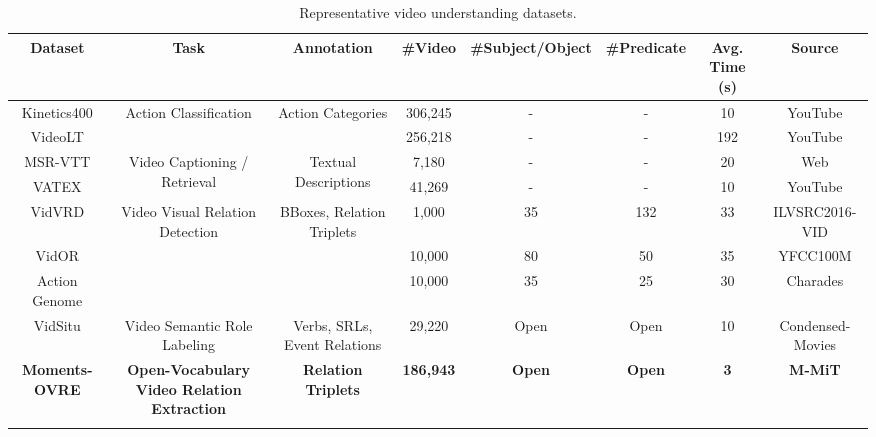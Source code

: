 \documentclass[letterpaper]{article}
\begin{document}
\begin{table}[t]
    \centering
    \caption{Representative video understanding datasets.}
    \begin{adjustbox}{width=\textwidth}
    \begin{tabular}{cccccccc}
        \toprule
        Dataset & Task & Annotation & \#Video & \#Subject/Object & \#Predicate & Avg. Time (s) & Source \\
        \midrule
        Kinetics400 & \multirow{2}{*}{Action Classification} & \multirow{2}{*}{Action Categories} & 306,245 & - & - & 10 & YouTube\\
        VideoLT &  &  & 256,218 & - & - & 192 & YouTube\\
        \midrule
         MSR-VTT & \multirow{2}{*}{Video Captioning / Retrieval} & \multirow{2}{*}{Textual Descriptions} & 7,180 & - & - & 20 & Web\\
         VATEX & & & 41,269 & - & - & 10 & YouTube\\
        \midrule
        VidVRD & \multirow{3}{*}{Video Visual Relation Detection} & \multirow{3}{*}{BBoxes, Relation Triplets} & 1,000 & 35 & 132 & 33 & ILVSRC2016-VID\\
        VidOR & & & 10,000 & 80 & 50 & 35 & YFCC100M\\
        Action Genome & & & 10,000 & 35 & 25 & 30 & Charades\\
        \midrule
        VidSitu & Video Semantic Role Labeling & Verbs, SRLs, Event Relations & 29,220 & Open & Open & 10 & Condensed-Movies\\
        \midrule
        \textbf{Moments-OVRE} & \textbf{Open-Vocabulary Video Relation Extraction} & \textbf{Relation Triplets} & \textbf{186,943} & \textbf{Open} & \textbf{Open} & \textbf{3} & \textbf{M-MiT}\\

        \bottomrule
        \\
    \end{tabular}
    \end{adjustbox}
    \label{tab:dataset_comp}
\end{table}
\end{document}
